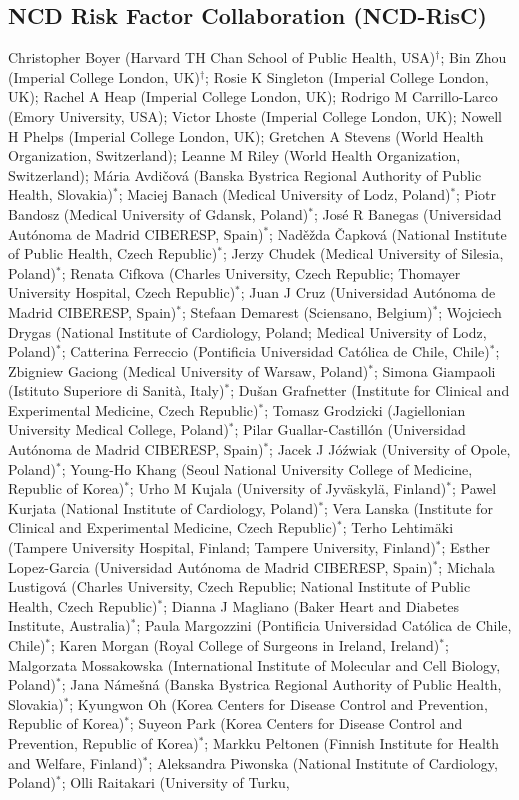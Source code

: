 \documentclass[12pt]{article}
\begin{document}
\begin{refsection}
\section*{NCD Risk Factor Collaboration (NCD-RisC)}
Christopher Boyer (Harvard TH Chan School of Public Health, USA)$^{\dagger}$; Bin Zhou (Imperial College London, UK)$^{\dagger}$; Rosie K Singleton (Imperial College London, UK); Rachel A Heap (Imperial College London, UK); Rodrigo M Carrillo-Larco (Emory University, USA); Victor Lhoste (Imperial College London, UK); Nowell H Phelps (Imperial College London, UK); Gretchen A Stevens (World Health Organization, Switzerland); Leanne M Riley (World Health Organization, Switzerland); Mária Avdičová (Banska Bystrica Regional Authority of Public Health, Slovakia)$^{*}$; Maciej Banach (Medical University of Lodz, Poland)$^{*}$; Piotr Bandosz (Medical University of Gdansk, Poland)$^{*}$; José R Banegas (Universidad Autónoma de Madrid CIBERESP, Spain)$^{*}$; Naděžda Čapková (National Institute of Public Health, Czech Republic)$^{*}$; Jerzy Chudek (Medical University of Silesia, Poland)$^{*}$; Renata Cifkova (Charles University, Czech Republic; Thomayer University Hospital, Czech Republic)$^{*}$; Juan J Cruz (Universidad Autónoma de Madrid CIBERESP, Spain)$^{*}$; Stefaan Demarest (Sciensano, Belgium)$^{*}$; Wojciech Drygas (National Institute of Cardiology, Poland; Medical University of Lodz, Poland)$^{*}$; Catterina Ferreccio (Pontificia Universidad Católica de Chile, Chile)$^{*}$; Zbigniew Gaciong (Medical University of Warsaw, Poland)$^{*}$; Simona Giampaoli (Istituto Superiore di Sanità, Italy)$^{*}$; Dušan Grafnetter (Institute for Clinical and Experimental Medicine, Czech Republic)$^{*}$; Tomasz Grodzicki (Jagiellonian University Medical College, Poland)$^{*}$; Pilar Guallar-Castillón (Universidad Autónoma de Madrid CIBERESP, Spain)$^{*}$; Jacek J Jóźwiak (University of Opole, Poland)$^{*}$; Young-Ho Khang (Seoul National University College of Medicine, Republic of Korea)$^{*}$; Urho M Kujala (University of Jyväskylä, Finland)$^{*}$; Pawel Kurjata (National Institute of Cardiology, Poland)$^{*}$; Vera Lanska (Institute for Clinical and Experimental Medicine, Czech Republic)$^{*}$; Terho Lehtimäki (Tampere University Hospital, Finland; Tampere University, Finland)$^{*}$; Esther Lopez-Garcia (Universidad Autónoma de Madrid CIBERESP, Spain)$^{*}$; Michala Lustigová (Charles University, Czech Republic; National Institute of Public Health, Czech Republic)$^{*}$; Dianna J Magliano (Baker Heart and Diabetes Institute, Australia)$^{*}$; Paula Margozzini (Pontificia Universidad Católica de Chile, Chile)$^{*}$; Karen Morgan (Royal College of Surgeons in Ireland, Ireland)$^{*}$; Malgorzata Mossakowska (International Institute of Molecular and Cell Biology, Poland)$^{*}$; Jana Námešná (Banska Bystrica Regional Authority of Public Health, Slovakia)$^{*}$; Kyungwon Oh (Korea Centers for Disease Control and Prevention, Republic of Korea)$^{*}$; Suyeon Park (Korea Centers for Disease Control and Prevention, Republic of Korea)$^{*}$; Markku Peltonen (Finnish Institute for Health and Welfare, Finland)$^{*}$; Aleksandra Piwonska (National Institute of Cardiology, Poland)$^{*}$; Olli Raitakari (University of Turku, 
\end{refsection}
\end{document}
